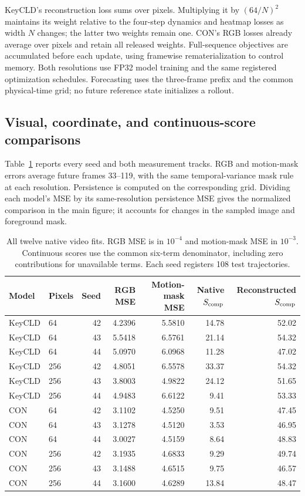 KeyCLD's reconstruction loss sums over pixels. Multiplying it by $(64/N)^2$ maintains its weight relative to the four-step dynamics and heatmap losses as width $N$ changes; the latter two weights remain one. CON's RGB losses already average over pixels and retain all released weights. Full-sequence objectives are accumulated before each update, using framewise rematerialization to control memory. Both resolutions use FP32 model training and the same registered optimization schedules. Forecasting uses the three-frame prefix and the common physical-time grid; no future reference state initializes a rollout.

\subsection{Visual, coordinate, and continuous-score comparisons}
Table~\ref{app:resolution-seeds} reports every seed and both measurement tracks. RGB and motion-mask errors average future frames 33--119, with the same temporal-variance mask rule at each resolution. Persistence is computed on the corresponding grid. Dividing each model's MSE by its same-resolution persistence MSE gives the normalized comparison in the main figure; it accounts for changes in the sampled image and foreground mask.

\begin{table}[t]
\caption{All twelve native video fits. RGB MSE is in $10^{-4}$ and motion-mask MSE in $10^{-3}$. Continuous scores use the common six-term denominator, including zero contributions for unavailable terms. Each seed registers 108 test trajectories.}
\label{app:resolution-seeds}
\centering\small
\begin{tabular}{llrrrrr}
\toprule
Model & Pixels & Seed & RGB MSE & Motion-mask MSE & Native $S_{\rm comp}$ & Reconstructed $S_{\rm comp}$\\
\midrule
KeyCLD & 64 & 42 & 4.2396 & 5.5810 & 14.78 & 52.02 \\
KeyCLD & 64 & 43 & 5.5418 & 6.5761 & 21.14 & 54.32 \\
KeyCLD & 64 & 44 & 5.0970 & 6.0968 & 11.28 & 47.02 \\
KeyCLD & 256 & 42 & 4.8051 & 6.5578 & 33.37 & 54.32 \\
KeyCLD & 256 & 43 & 3.8003 & 4.9822 & 24.12 & 51.65 \\
KeyCLD & 256 & 44 & 4.9483 & 6.6122 & 9.41 & 53.33 \\
CON & 64 & 42 & 3.1102 & 4.5250 & 9.51 & 47.45 \\
CON & 64 & 43 & 3.1278 & 4.5120 & 3.53 & 46.95 \\
CON & 64 & 44 & 3.0027 & 4.5159 & 8.64 & 48.83 \\
CON & 256 & 42 & 3.1935 & 4.6833 & 9.29 & 49.74 \\
CON & 256 & 43 & 3.1488 & 4.6515 & 9.75 & 46.57 \\
CON & 256 & 44 & 3.1600 & 4.6289 & 13.84 & 48.47 \\
\bottomrule
\end{tabular}
\end{table}

